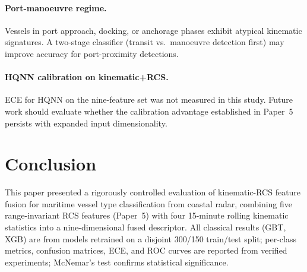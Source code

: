 \documentclass[journal]{IEEEtran}
\begin{document}
\paragraph{Port-manoeuvre regime.} Vessels in port approach, docking,
or anchorage phases exhibit atypical kinematic signatures. A two-stage
classifier (transit vs.\ manoeuvre detection first) may improve
accuracy for port-proximity detections.

\paragraph{HQNN calibration on kinematic+RCS.} ECE for HQNN on the
nine-feature set was not measured in this study. Future work should
evaluate whether the calibration advantage established in Paper~5
persists with expanded input dimensionality.

\section{Conclusion}
\label{sec:conclusion}

This paper presented a rigorously controlled evaluation of
kinematic-RCS feature fusion for maritime vessel type classification
from coastal radar, combining five range-invariant RCS features
(Paper~5) with four 15-minute rolling kinematic statistics into a
nine-dimensional fused descriptor. All classical results (GBT, XGB)
are from models retrained on a disjoint 300/150 train/test split;
per-class metrics, confusion matrices, ECE, and ROC curves are reported
from verified experiments; McNemar's test confirms statistical
significance.
\end{document}
